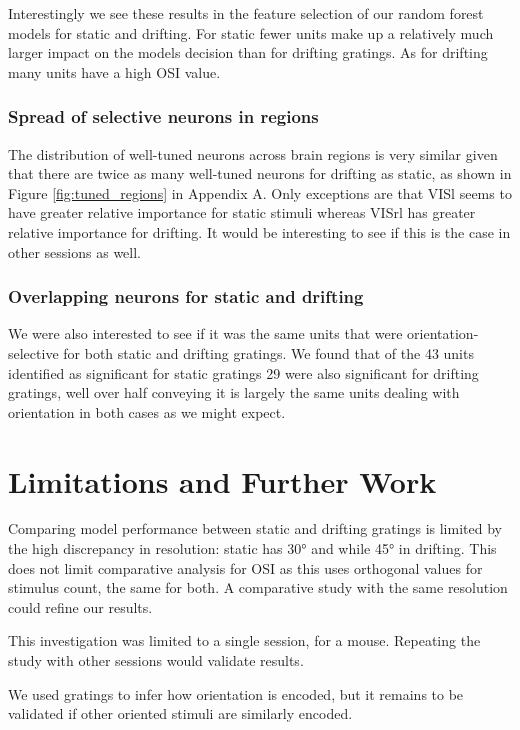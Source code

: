 \documentclass[10pt,twocolumn]{article}
\begin{document}
Interestingly we see these results in the feature selection of our random forest models for static and drifting. For static fewer units make up a relatively much larger impact on the models decision than for drifting gratings. As for drifting many units have a high OSI value. 

\subsubsection{Spread of selective neurons in regions}

The distribution of well-tuned neurons across brain regions is very similar given that there are twice as many well-tuned neurons for drifting as static, as shown in Figure \ref{fig:tuned_regions} in Appendix A. Only exceptions are that VISl seems to have greater relative importance for static stimuli whereas VISrl has greater relative importance for drifting. It would be interesting to see if this is the case in other sessions as well.

\subsubsection{Overlapping neurons for static and drifting}

We were also interested to see if it was the same units that were orientation-selective for both static and drifting gratings. We found that of the 43 units identified as significant for static gratings 29 were also significant for drifting gratings, well over half conveying it is largely the same units dealing with orientation in both cases as we might expect.

\section{Limitations and Further Work}

Comparing model performance between static and drifting gratings is limited by the high discrepancy in resolution: static has 30° and while 45° in drifting. This does not limit comparative analysis for OSI as this uses orthogonal values for stimulus count, the same for both. A comparative study with the same resolution could refine our results.

This investigation was limited to a single session, for a mouse. Repeating the study with other sessions would validate results.

We used gratings to infer how orientation is encoded, but it remains to be validated if other oriented stimuli are similarly encoded.
\end{document}
